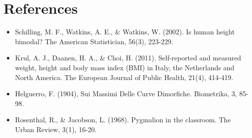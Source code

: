 \documentclass[12pt]{article}
\begin{document}
\section*{References}
\begin{itemize}
\item Schilling, M. F., Watkins, A. E., \& Watkins, W. (2002). Is human height bimodal? The American Statistician, 56(3), 223-229.
\item Krul, A. J., Daanen, H. A., \& Choi, H. (2011). Self-reported and measured weight, height and body mass index (BMI) in Italy, the Netherlands and North America. The European Journal of Public Health, 21(4), 414-419.
\item Helguerro, F. (1904), Sui Massimi Delle Curve Dimorfiche. Biometrika, 3, 85-98. 
\item Rosenthal, R., \& Jacobson, L. (1968). Pygmalion in the classroom. The Urban Review, 3(1), 16-20.
\end{itemize}
\end{document}
